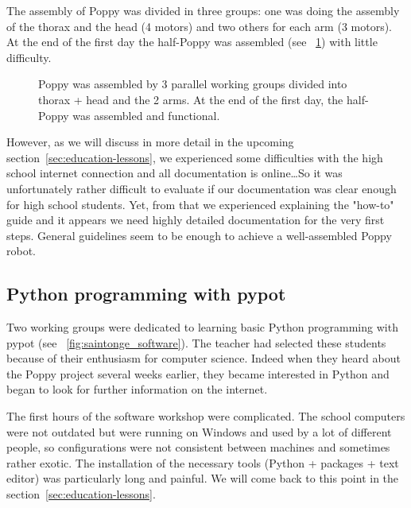 The assembly of Poppy was divided in three groups: one was doing the assembly of the thorax and the head (4 motors) and two others for each arm (3 motors). At the end of the first day the half-Poppy was assembled (see \figurename~\ref{fig:saintonge_assembly}) with little difficulty.

\begin{figure}[h!]
\centering
    \hfil
    \hfil
    \hfil
    \caption{Poppy was assembled by 3 parallel working groups divided into thorax + head and the 2 arms. At the end of the first day, the half-Poppy was assembled and functional. }
    \label{fig:saintonge_assembly}
\end{figure}

However, as we will discuss in more detail in the upcoming section~\ref{sec:education-lessons}, we experienced some difficulties with the high school internet connection and all documentation is online\dots So it was unfortunately rather difficult to evaluate if our documentation was clear enough for high school students. Yet, from that we experienced explaining the "how-to" guide and it appears we need highly detailed documentation for the very first steps. General guidelines seem to be enough to achieve a well-assembled Poppy robot.

\subsection{Python programming with pypot}

Two working groups were dedicated to learning basic Python programming with pypot (see \figurename~\ref{fig:saintonge_software}). The teacher had selected these students because of their enthusiasm for computer science. Indeed when they heard about the Poppy project several weeks earlier, they became interested in Python and began to look for further information on the internet.

The first hours of the software workshop were complicated. The school computers were not outdated but were running on Windows and used by a lot of different people, so configurations were not consistent between machines and sometimes rather exotic. The installation of the necessary tools (Python + packages + text editor) was particularly long and painful. We will come back to this point in the section~\ref{sec:education-lessons}.

